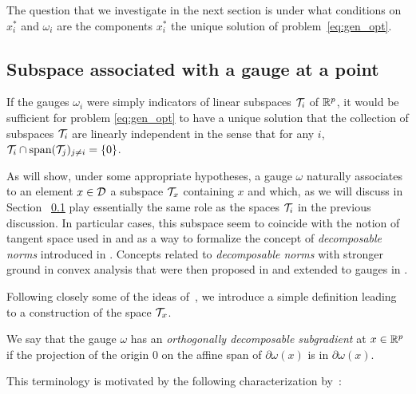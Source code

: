 \documentclass{article}
\begin{document}
The question that we investigate in the next section is under what conditions on $x_i^*$ and $\omega_i$ are the components $x_i^*$ the unique solution of problem~\eqref{eq:gen_opt}.

\subsection{Subspace associated with a gauge at a point}

If the gauges $\omega_i$ were simply indicators of linear subspaces $\mathcal{T}_i$ of $\mathbb{R}^p$, it would be sufficient for problem \eqref{eq:gen_opt} to have a unique solution that the collection of subspaces $\mathcal{T}_i$ are linearly independent in the sense that for any $i$, $\mathcal{T}_i \cap \text{span}(\mathcal{T}_j)_{j \neq i}=\{0\}$. 

As will show, under some appropriate hypotheses, a gauge $\omega$ naturally associates to an element $x \in \mathcal{D}$ a subspace $\mathcal{T}_x$ containing $x$ and which, as we will discuss in Section ~\ref{} play essentially the same role as the spaces $\mathcal{T}_i$ in the previous discussion. In particular cases, this subspace seem to coincide with the notion of tangent space used in \citet{chandrasekaran2011rank} and as a way to formalize the concept of \emph{decomposable norms} introduced in \citet{negahban2012unified}. Concepts related to \emph{decomposable norms} with stronger ground in convex analysis that were then proposed in \citet{candes2013simple} and extended to gauges in \citet{vaiter2015model} \citep[see also][]{fadili2013stable,vaiter2015low}.

Following closely some of the ideas of~\citet{vaiter2015model}, we introduce a simple definition leading to a construction of the space $\mathcal{T}_x$. 

\begin{mydef}
We say that the gauge $\omega$ has an \emph{orthogonally decomposable subgradient} at $x \in \mathbb{R}^p$ if the projection of the origin $0$ on the affine span of $\partial \omega(x)$ is in $\partial \omega(x)$.
\end{mydef}


This terminology is motivated by the following characterization by~\citet{vaiter2015model}:
\end{document}
